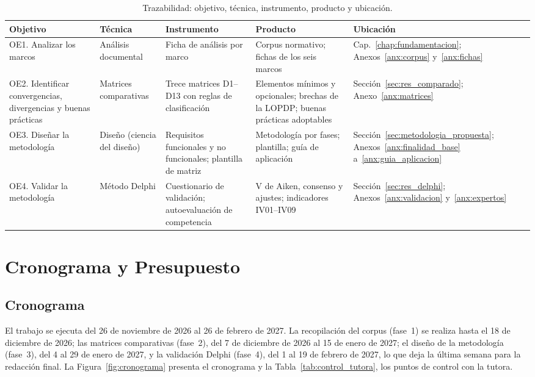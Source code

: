 \begin{table}[htbp]
  \centering
  \caption{Trazabilidad: objetivo, técnica, instrumento, producto y ubicación.}
  \label{tab:trazabilidad_investigacion}
  \scriptsize
  \renewcommand{\arraystretch}{1.2}
  \begin{tabularx}{\textwidth}{|>{\raggedright\arraybackslash}p{2.2cm}|>{\raggedright\arraybackslash}p{2.4cm}|L|L|>{\raggedright\arraybackslash}p{2.2cm}|}
    \hline
    \textbf{Objetivo} & \textbf{Técnica} & \textbf{Instrumento} & \textbf{Producto} & \textbf{Ubicación} \\
    \hline
    OE1. Analizar los marcos & Análisis documental & Ficha de análisis por marco & Corpus normativo; fichas de los seis marcos & Cap.~\ref{chap:fundamentacion}; Anexos~\ref{anx:corpus} y~\ref{anx:fichas} \\ \hline
    OE2. Identificar convergencias, divergencias y buenas prácticas & Matrices comparativas & Trece matrices D1--D13 con reglas de clasificación & Elementos mínimos y opcionales; brechas de la LOPDP; buenas prácticas adoptables & Sección~\ref{sec:res_comparado}; Anexo~\ref{anx:matrices} \\ \hline
    OE3. Diseñar la metodología & Diseño (ciencia del diseño) & Requisitos funcionales y no funcionales; plantilla de matriz & Metodología por fases; plantilla; guía de aplicación & Sección~\ref{sec:metodologia_propuesta}; Anexos~\ref{anx:finalidad_base} a~\ref{anx:guia_aplicacion} \\ \hline
    OE4. Validar la metodología & Método Delphi & Cuestionario de validación; autoevaluación de competencia & V de Aiken, consenso y ajustes; indicadores IV01--IV09 & Sección~\ref{sec:res_delphi}; Anexos~\ref{anx:validacion} y~\ref{anx:expertos} \\ \hline
  \end{tabularx}
  \raggedright
\end{table}

\section{Cronograma y Presupuesto}
\label{sec:cronograma}

\subsection{Cronograma}

El trabajo se ejecuta del 26 de noviembre de 2026 al 26 de febrero de 2027. La recopilación del corpus (fase~1) se realiza hasta el 18 de diciembre de 2026; las matrices comparativas (fase~2), del 7 de diciembre de 2026 al 15 de enero de 2027; el diseño de la metodología (fase~3), del 4 al 29 de enero de 2027, y la validación Delphi (fase~4), del 1 al 19 de febrero de 2027, lo que deja la última semana para la redacción final. La Figura~\ref{fig:cronograma} presenta el cronograma y la Tabla~\ref{tab:control_tutora}, los puntos de control con la tutora.

